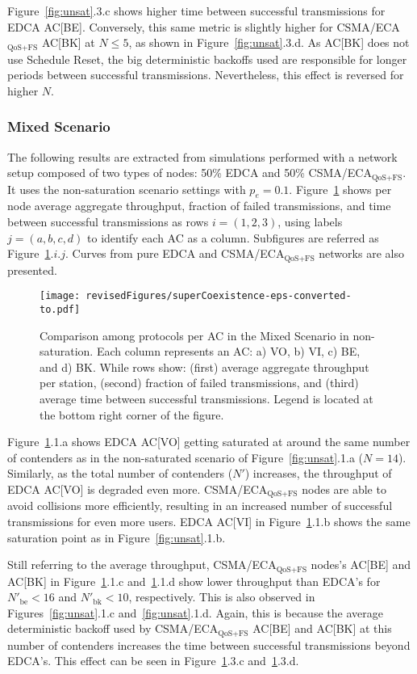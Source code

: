 \documentclass[a4paper]{article}
\begin{document}
Figure~\ref{fig:unsat}.3.c shows higher time between successful transmissions for EDCA AC[BE]. Conversely, this same metric is slightly higher for CSMA/ECA$_{\text{QoS+FS}}$ AC[BK] at $N\le 5$, as shown in Figure~\ref{fig:unsat}.3.d. As AC[BK] does not use Schedule Reset, the big deterministic backoffs used are responsible for longer periods between successful transmissions. Nevertheless, this effect is reversed for higher $N$.

\subsubsection{Mixed Scenario}\label{mixSection}
The following results are extracted from simulations performed with a network setup composed of two types of nodes: 50\% EDCA and 50\% CSMA/ECA$_{\text{QoS+FS}}$. It uses the non-saturation scenario settings with $p_e=0.1$. Figure~\ref{mix} shows per node average aggregate throughput, fraction of failed transmissions, and time between successful transmissions as rows $i=(1, 2, 3)$, using labels $j=(a, b, c, d)$ to identify each AC as a column. Subfigures are referred as Figure~\ref{mix}$.i.j$. Curves from pure EDCA and CSMA/ECA$_{\text{QoS+FS}}$ networks are also presented.

	\begin{figure}[t]
	\centering
		\texttt{[image: revisedFigures/superCoexistence-eps-converted-to.pdf]}
		\caption{Comparison among protocols per AC in the Mixed Scenario in non-saturation. Each column represents an AC: a) VO, b) VI, c) BE, and d) BK. While rows show: (first) average aggregate throughput per station, (second) fraction of failed transmissions, and (third) average time between successful transmissions. Legend is located at the bottom right corner of the figure.}
		\label{mix}
	\end{figure}

Figure~\ref{mix}.1.a shows EDCA AC[VO] getting saturated at around the same number of contenders as in the non-saturated scenario of Figure~\ref{fig:unsat}.1.a ($N=14$). Similarly, as the total number of contenders ($N'$) increases, the throughput of EDCA AC[VO] is degraded even more. CSMA/ECA$_{\text{QoS+FS}}$ nodes are able to avoid collisions more efficiently, resulting in an increased number of successful transmissions for even more users. EDCA AC[VI] in Figure~\ref{mix}.1.b shows the same saturation point as in Figure~\ref{fig:unsat}.1.b.

Still referring to the average throughput, CSMA/ECA$_{\text{QoS+FS}}$ nodes's AC[BE] and AC[BK] in Figure~\ref{mix}.1.c and~\ref{mix}.1.d show lower throughput than EDCA's for $N'_{\text{be}}<16$ and $N'_{\text{bk}}<10$, respectively. This is also observed in Figures~\ref{fig:unsat}.1.c and~\ref{fig:unsat}.1.d. Again, this is because the average deterministic backoff used by CSMA/ECA$_{\text{QoS+FS}}$ AC[BE] and AC[BK] at this number of contenders increases the time between successful transmissions beyond EDCA's. This effect can be seen in Figure~\ref{mix}.3.c and~\ref{mix}.3.d.
\end{document}
